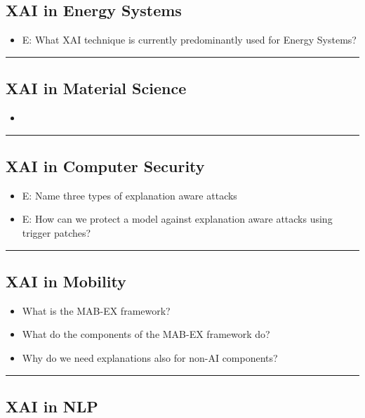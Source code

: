 \documentclass{report}
\newcommand{\asw}[2][teal]{}
\renewcommand{\asw}[2][teal]{\textcolor{#1}{#2}}
\begin{document}
		\subsection{XAI in Energy Systems}
		
		\begin{itemize}
		\item E: What XAI technique is currently predominantly used for Energy Systems?
		\asw{\newline }
		\end{itemize}
		\hrule 
	
		\subsection{XAI in Material Science}
		
		\begin{itemize}
		\item 
		\end{itemize}
		\hrule 
	
		\subsection{XAI in Computer Security}
		
		\begin{itemize}
		\item E: Name three types of explanation aware attacks
		\asw{\newline }
		\item E: How can we protect a model against explanation aware attacks using trigger patches?
		\asw{\newline }
		\end{itemize}
		\hrule 
	
		\subsection{XAI in Mobility}
		
		\begin{itemize}
		\item What is the MAB-EX framework?
		\item What do the components of the MAB-EX framework do?
		\item Why do we need explanations also for non-AI components?
		\end{itemize}
		\hrule 
	
		\subsection{XAI in NLP}
		
\end{document}
